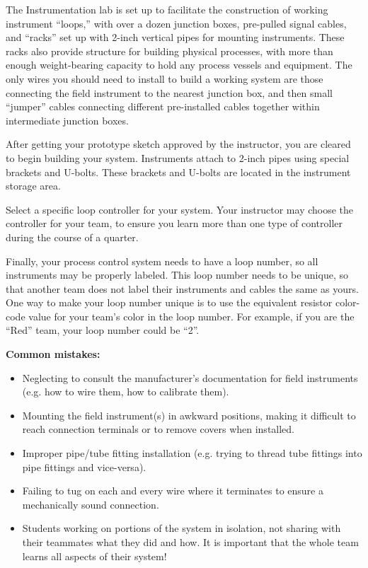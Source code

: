 The Instrumentation lab is set up to facilitate the construction of working instrument ``loops,'' with over a dozen junction boxes, pre-pulled signal cables, and ``racks'' set up with 2-inch vertical pipes for mounting instruments.  These racks also provide structure for building physical processes, with more than enough weight-bearing capacity to hold any process vessels and equipment.  The only wires you should need to install to build a working system are those connecting the field instrument to the nearest junction box, and then small ``jumper'' cables connecting different pre-installed cables together within intermediate junction boxes.

After getting your prototype sketch approved by the instructor, you are cleared to begin building your system.  Instruments attach to 2-inch pipes using special brackets and U-bolts.  These brackets and U-bolts are located in the instrument storage area.  

Select a specific loop controller for your system.  Your instructor may choose the controller for your team, to ensure you learn more than one type of controller during the course of a quarter.

Finally, your process control system needs to have a loop number, so all instruments may be properly labeled.  This loop number needs to be unique, so that another team does not label their instruments and cables the same as yours.  One way to make your loop number unique is to use the equivalent resistor color-code value for your team's color in the loop number.  For example, if you are the ``Red'' team, your loop number could be ``2''. 

\vskip 10pt

{\bf Common mistakes:}

\begin{itemize}
\item{} Neglecting to consult the manufacturer's documentation for field instruments (e.g. how to wire them, how to calibrate them).
\item{} Mounting the field instrument(s) in awkward positions, making it difficult to reach connection terminals or to remove covers when installed.
\item{} Improper pipe/tube fitting installation (e.g. trying to thread tube fittings into pipe fittings and vice-versa).
\item{} Failing to tug on each and every wire where it terminates to ensure a mechanically sound connection.
\item{} Students working on portions of the system in isolation, not sharing with their teammates what they did and how.  It is important that the whole team learns all aspects of their system!
\end{itemize}


